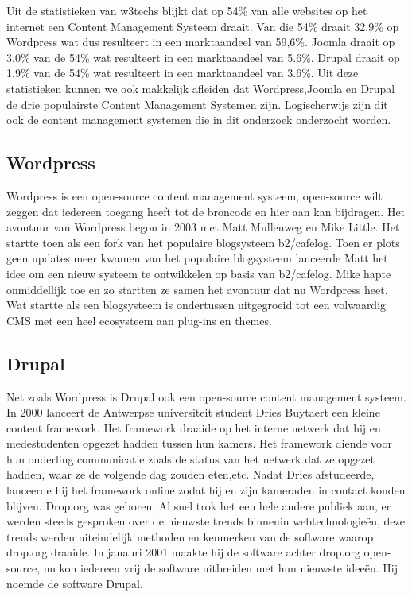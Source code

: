 Uit de statistieken van w3techs blijkt dat op 54\% van alle websites op het internet een Content Management Systeem draait.  Van die 54\% draait 32.9\% op Wordpress wat dus resulteert in een marktaandeel van 59,6\%. Joomla draait op 3.0\% van de 54\% wat resulteert in een marktaandeel van 5.6\%. Drupal draait op 1.9\% van de 54\% wat resulteert in een marktaandeel van 3.6\%. Uit deze statistieken kunnen we ook makkelijk afleiden dat Wordpress,Joomla en Drupal de drie populairste Content Management Systemen zijn. Logischerwijs zijn dit ook de content management systemen die in dit onderzoek onderzocht worden. \autocite{w3techs2018}


\subsection{Wordpress}
Wordpress is een open-source content management systeem, open-source wilt zeggen dat iedereen toegang heeft tot de broncode en hier aan kan bijdragen. Het avontuur van Wordpress begon in 2003 met Matt Mullenweg en Mike Little. Het startte toen als een fork van het populaire blogsysteem b2/cafelog. Toen er plots geen updates meer kwamen van het populaire blogsysteem lanceerde Matt het idee om een nieuw systeem te ontwikkelen op basis van b2/cafelog. Mike hapte onmiddellijk toe en zo startten ze samen het avontuur dat nu Wordpress heet. Wat startte als een blogsysteem is ondertussen uitgegroeid tot een volwaardig CMS met een heel ecosysteem aan plug-ins en themes.\autocite{Postma2018}

\subsection{Drupal}
Net zoals Wordpress is Drupal ook een open-source content management systeem. In 2000 lanceert de Antwerpse universiteit student Dries Buytaert een kleine content framework. Het framework draaide op het interne netwerk dat hij en medestudenten opgezet hadden tussen hun kamers. Het framework diende voor hun onderling communicatie zoals de status van het netwerk dat ze opgezet hadden, waar ze de volgende dag zouden eten,etc. Nadat Dries afstudeerde, lanceerde hij het framework online zodat hij en zijn kameraden in contact konden blijven. Drop.org was geboren. Al snel trok het een hele andere publiek aan, er werden steeds gesproken over de nieuwste trends binnenin webtechnologieën, deze trends werden uiteindelijk methoden en kenmerken van de software waarop drop.org draaide. In janauri 2001 maakte hij de software achter drop.org open-source, nu kon iedereen vrij de software uitbreiden met hun nieuwste ideeën. Hij noemde de software Drupal.\autocite{Drupal2018}

